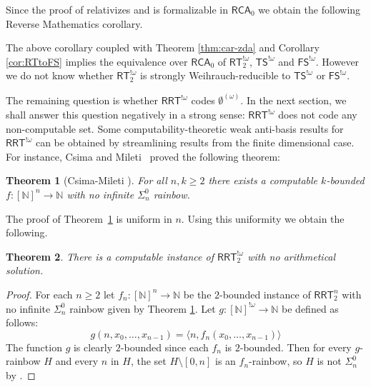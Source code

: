 \documentclass{article}
\newcommand{\RCA}[0]{\mathsf{RCA}}
\newcommand{\ACA}[0]{\mathsf{ACA}}
\newcommand{\RRT}[0]{\mathsf{RRT}}
\newcommand{\FS}[0]{\mathsf{FS}}
\newcommand{\TS}[0]{\mathsf{TS}}
\newcommand{\RT}[0]{\mathsf{RT}}
\newcommand{\NN}[0]{\mathbb{N}}
\newtheorem{theorem}{Theorem}
\numberwithin{theorem}{section}
\newtheorem{corollary}[theorem]{Corollary}
\newcommand{\ludovic}[1]{\textcolor{blue}{#1}}
\begin{document}
Since the proof of  relativizes and is formalizable in $\RCA_0$ we obtain the following Reverse Mathematics corollary.


The above corollary coupled with Theorem \ref{thm:car-zda} and Corollary \ref{cor:RTtoFS} implies the equivalence over $\RCA_0$ of $\RT^{!\omega}_2$, $\TS^{!\omega}$ and $\FS^{!\omega}$. However we do not know whether $\RT^{!\omega}_2$ is strongly Weihrauch-reducible to $\TS^{!\omega}$ or $\FS^{!\omega}$.


The remaining question is whether $\RRT^{!\omega}$ codes $\emptyset^{(\omega)}$. In the next section, we shall answer this question negatively in a strong sense: $\RRT^{!\omega}$ does not code any non-computable set.
Some computability-theoretic weak anti-basis results for $\RRT^{!\omega}$ can be obtained by streamlining results from the finite dimensional case. For instance, Csima and Mileti~\cite{CsimaMileti_2009} proved the following theorem:

\begin{theorem}[Csima-Mileti \cite{CsimaMileti_2009}]\label{thm:csi-mil}
For all $n,k\geq 2$ there exists a computable $k$-bounded $f:[\NN]^n \to \NN$ with no infinite $\Sigma^0_n$ rainbow.
\end{theorem}

The proof of Theorem~\ref{thm:csi-mil} is uniform in $n$. Using this uniformity we obtain the following. 

\begin{theorem}
There is a computable instance of $\RRT^{!\omega}_2$ with no arithmetical solution.
\end{theorem}

\begin{proof}
    
For each $n\geq 2$ let $f_n : [\NN]^n \to \NN$  be the $2$-bounded instance of $\RRT^n_2$ with no infinite $\Sigma^0_n$ rainbow given by Theorem \ref{thm:csi-mil}. Let $g:[\NN]^{!\omega} \to \NN$ be defined as follows:
$$g(n, x_0, \dots, x_{n-1}) = \langle n, f_n(x_0, \dots, x_{n-1}) \rangle$$   %
The function $g$ is clearly $2$-bounded since each $f_n$ is $2$-bounded. Then for every $g$-rainbow $H$ and every $n$ in $H$, the set $H \setminus [0,n]$ is an $f_n$-rainbow, so $H$ is not $\Sigma^0_n$ by .
\end{proof}
\end{document}
